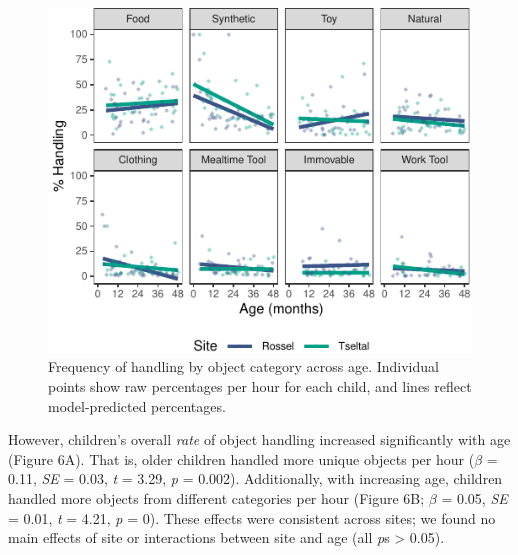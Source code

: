 \documentclass[10pt, letterpaper]{article}
\newenvironment{CodeChunk}{}{}
\begin{document}
\begin{CodeChunk}
\begin{figure}[!ht]

{\centering \includegraphics{figs/age-effects-bycategory-fig-1} 

}

\caption[Frequency of handling by object category across age]{Frequency of handling by object category across age. Individual points show raw percentages per hour for each child, and lines reflect model-predicted percentages.}\label{fig:age-effects-bycategory-fig}
\end{figure}
\end{CodeChunk}

However, children's overall \emph{rate} of object handling increased
significantly with age (Figure 6A). That is, older children handled more
unique objects per hour (\(\beta\) = 0.11, \emph{SE} = 0.03, \emph{t} =
3.29, \emph{p} = 0.002). Additionally, with increasing age, children
handled more objects from different categories per hour (Figure 6B;
\(\beta\) = 0.05, \emph{SE} = 0.01, \emph{t} = 4.21, \emph{p} = 0).
These effects were consistent across sites; we found no main effects of
site or interactions between site and age (all \emph{p}s \textgreater{}
0.05).
\end{document}
